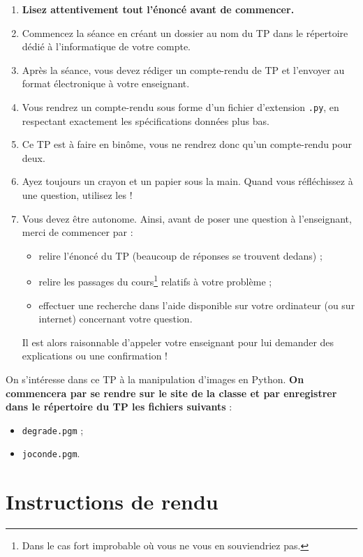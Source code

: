 \begin{enumerate}
\item  \textbf{Lisez attentivement  tout l'énoncé
    avant de commencer.}
\item Commencez la séance en créant un dossier au nom du TP dans le répertoire dédié à l'informatique de votre compte. 
\item Après la séance, vous devez rédiger un compte-rendu de TP et
l'envoyer au format électronique à votre enseignant.
\item Vous rendrez un compte-rendu sous forme d'un fichier d'extension \texttt{.py}, en respectant exactement les spécifications données plus bas. 
\item Ce TP est à faire en binôme, vous ne rendrez donc qu'un  compte-rendu pour deux.
\item Ayez toujours un crayon et un papier sous la main. Quand vous réfléchissez à une question, utilisez les !
\item Vous devez être autonome. Ainsi, avant de poser une question à l'enseignant, merci de commencer par :
\begin{itemize}
  \item relire l'énoncé du TP (beaucoup de réponses se trouvent dedans) ;
  \item relire les passages du cours\footnote{Dans le cas fort 
improbable où vous ne vous en souviendriez pas.} relatifs à votre problème ;
  \item effectuer une recherche dans l'aide disponible sur votre ordinateur (ou sur internet) concernant votre question.
\end{itemize}
  Il est alors raisonnable d'appeler votre enseignant pour lui demander des explications ou une confirmation !
\end{enumerate}

On s'intéresse dans ce TP à la manipulation d'images en Python. {\bf On commencera par se rendre sur le site de la classe et par enregistrer dans le répertoire du TP les fichiers suivants} : 
\begin{itemize}
  \item \texttt{degrade.pgm} ;
  \item \texttt{joconde.pgm}.
\end{itemize}

\section*{Instructions de rendu}

